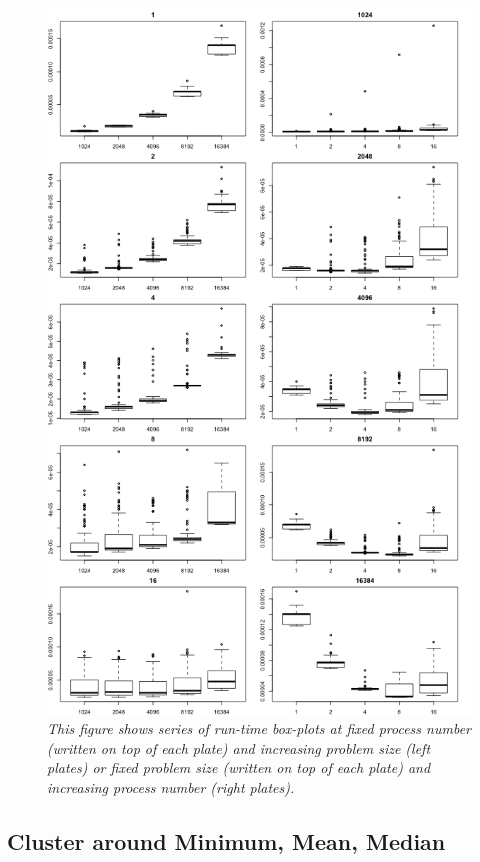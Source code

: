 \documentclass[a4paper,11pt,twoside]{article}
\begin{document}
\begin{figure}
  \centering
    \includegraphics[width=1\textwidth]{test_box.png}
    \caption{\textit{This figure shows series of run-time box-plots at fixed process number (written on top of each plate) and increasing problem size (left plates) or fixed problem size (written on top of each plate) and increasing process number (right plates).}}
    \label{fig:boxplot}
\end{figure}



\subsection{Cluster around Minimum, Mean, Median}
\end{document}
